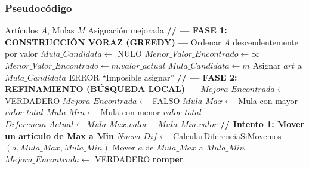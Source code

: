 \documentclass[12pt, a4paper]{article}
\begin{document}
    \subsubsection{Pseudocódigo}
    \begin{algorithm}[H]
        \caption{Heurística con Búsqueda Local (Hill Climbing)}
        \begin{algorithmic}[1]
            \Require Artículos $A$, Mulas $M$
            \Ensure Asignación mejorada
            \State \textbf{// --- FASE 1: CONSTRUCCIÓN VORAZ (GREEDY) ---}
            \State Ordenar $A$ descendentemente por valor
            \State
                \State $Mula\_Candidata \gets$ NULO
                \State $Menor\_Valor\_Encontrado \gets \infty$
                \State
                            \State $Menor\_Valor\_Encontrado \gets m.valor\_actual$
                            \State $Mula\_Candidata \gets m$
                        \EndIf
                    \EndIf
                \EndFor
                \State
                    \State Asignar $art$ a $Mula\_Candidata$
                \Else
                    \State \Return ERROR ``Imposible asignar''
                \EndIf
            \EndFor
            \State
            \State \textbf{// --- FASE 2: REFINAMIENTO (BÚSQUEDA LOCAL) ---}
            \State $Mejora\_Encontrada \gets$ VERDADERO
            \State
                \State $Mejora\_Encontrada \gets$ FALSO
                \State $Mula\_Max \gets$ Mula con mayor $valor\_total$
                \State $Mula\_Min \gets$ Mula con menor $valor\_total$
                \State $Diferencia\_Actual \gets Mula\_Max.valor - Mula\_Min.valor$
                \State
                \State \textbf{// Intento 1: Mover un artículo de Max a Min}
                        \State $Nueva\_Dif \gets$ CalcularDiferenciaSiMovemos$(a, Mula\_Max, Mula\_Min)$
                            \State Mover $a$ de $Mula\_Max$ a $Mula\_Min$
                            \State $Mejora\_Encontrada \gets$ VERDADERO
                            \State \textbf{romper} 

\end{algorithmic}
\end{algorithm}
\end{document}
